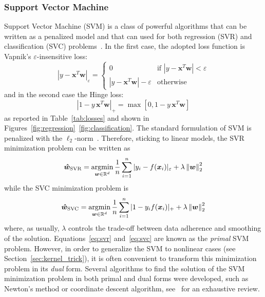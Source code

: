 			\subsubsection{Support Vector Machine} \label{sec:svm}
			Support Vector Machine (\ac{SVM}) is a class of powerful algorithms that can be written as a penalized model and that can used for both regression (\ac{SVR}) and classification (\ac{SVC}) problems~\cite{evgeniou2000regularization}. In the first case, the adopted loss function is Vapnik's $\varepsilon$-insensitive loss:
			\begin{equation} \label{eq:epsilon_insensitive}
				|y - \bm{x}^T\bm{w}|_\varepsilon =
   			\begin{cases}
					0 & \text{if } |y-\bm{x}^T\bm{w}| < \varepsilon\\
					|y-\bm{x}^T\bm{w}| - \varepsilon & \text{otherwise}
				\end{cases}
			\end{equation}
			and in the second case the Hinge loss:
			\begin{equation} \label{eq:hinge_loss}
				|1 - y\,\bm{x}^T\bm{w}|_+ = \max[0, 1 - y\,\bm{x}^T\bm{w}]
			\end{equation}
			as reported in Table~\ref{tab:losses} and shown in Figures~\ref{fig:regression}~\ref{fig:classification}. The standard formulation of SVM is penalized with the $\ell_2$-norm~\cite{vapnik2013nature}.
			Therefore, sticking to linear models, the SVR minimization problem can be written as
			\begin{equation} \label{eq:svr}
				\bm{\hat w}_{\text{SVR}} = \mathop{\mathrm{argmin}}\limits_{\bm{w} \in \mathbb{R}^d} \frac{1}{n} \sum_{i=1}^n |y_i - f(\bm{x}_i)|_\varepsilon + \lambda \left\lVert\bm{w}\right\rVert_2^2
			\end{equation}
			while the SVC minimization problem is
			\begin{equation} \label{eq:svc}
				\bm{\hat w}_{\text{SVC}} = \mathop{\mathrm{argmin}}\limits_{\bm{w} \in \mathbb{R}^d} \frac{1}{n} \sum_{i=1}^n |1 - y_if(\bm{x}_i)|_+ + \lambda \left\lVert\bm{w}\right\rVert_2^2
			\end{equation}
			where, as usually, $\lambda$ controls the trade-off between data adherence and smoothing of the solution.
			Equations~\eqref{eq:svr} and~\eqref{eq:svc} are known as the \textit{primal} SVM problem. However, in order to generalize the SVM to nonlinear cases (see Section~\ref{sec:kernel_trick}), it is often convenient to transform this minimization problem in its \textit{dual} form. Several algorithms to find the solution of the SVM minimization problem in both primal and dual forms were developed, such as Newton's method or coordinate descent algorithm, see~\cite{smola2004tutorial, shawe2011review} for an exhaustive review.

